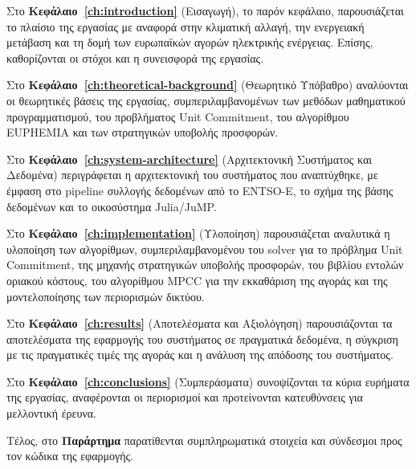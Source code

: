 Στο \textbf{Κεφάλαιο~\ref{ch:introduction}} (Εισαγωγή), το παρόν κεφάλαιο, παρουσιάζεται το πλαίσιο της εργασίας με αναφορά στην κλιματική αλλαγή, την ενεργειακή μετάβαση και τη δομή των ευρωπαϊκών αγορών ηλεκτρικής ενέργειας. Επίσης, καθορίζονται οι στόχοι και η συνεισφορά της εργασίας.

Στο \textbf{Κεφάλαιο~\ref{ch:theoretical-background}} (Θεωρητικό Υπόβαθρο) αναλύονται οι θεωρητικές βάσεις της εργασίας, συμπεριλαμβανομένων των μεθόδων μαθηματικού προγραμματισμού, του προβλήματος Unit Commitment, του αλγορίθμου EUPHEMIA και των στρατηγικών υποβολής προσφορών.

Στο \textbf{Κεφάλαιο~\ref{ch:system-architecture}} (Αρχιτεκτονική Συστήματος και Δεδομένα) περιγράφεται η αρχιτεκτονική του συστήματος που αναπτύχθηκε, με έμφαση στο pipeline συλλογής δεδομένων από το ENTSO-E, το σχήμα της βάσης δεδομένων και το οικοσύστημα Julia/JuMP.

Στο \textbf{Κεφάλαιο~\ref{ch:implementation}} (Υλοποίηση) παρουσιάζεται αναλυτικά η υλοποίηση των αλγορίθμων, συμπεριλαμβανομένου του solver για το πρόβλημα Unit Commitment, της μηχανής στρατηγικών υποβολής προσφορών, του βιβλίου εντολών οριακού κόστους, του αλγορίθμου MPCC για την εκκαθάριση της αγοράς και της μοντελοποίησης των περιορισμών δικτύου.

Στο \textbf{Κεφάλαιο~\ref{ch:results}} (Αποτελέσματα και Αξιολόγηση) παρουσιάζονται τα αποτελέσματα της εφαρμογής του συστήματος σε πραγματικά δεδομένα, η σύγκριση με τις πραγματικές τιμές της αγοράς και η ανάλυση της απόδοσης του συστήματος.

Στο \textbf{Κεφάλαιο~\ref{ch:conclusions}} (Συμπεράσματα) συνοψίζονται τα κύρια ευρήματα της εργασίας, αναφέρονται οι περιορισμοί και προτείνονται κατευθύνσεις για μελλοντική έρευνα.

Τέλος, στο \textbf{Παράρτημα} παρατίθενται συμπληρωματικά στοιχεία και σύνδεσμοι προς τον κώδικα της εφαρμογής.
